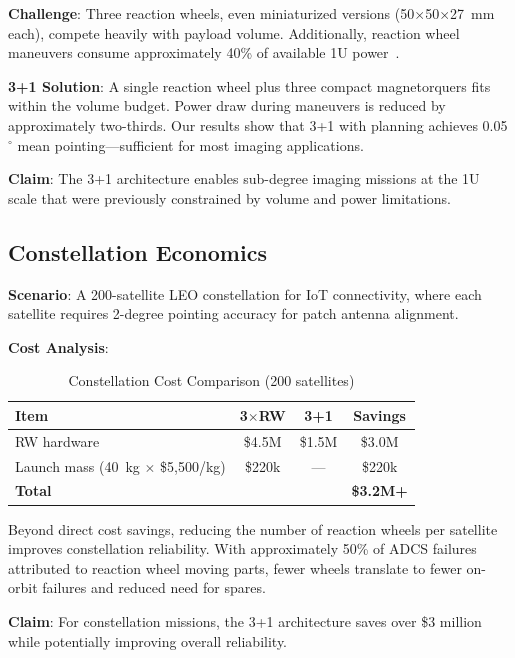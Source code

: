 \documentclass[9pt]{extarticle}
\begin{document}
\textbf{Challenge}: Three reaction wheels, even miniaturized versions (50$\times$50$\times$27~mm each), compete heavily with payload volume. Additionally, reaction wheel maneuvers consume approximately 40\% of available 1U power~\cite{calpoly2019cubesat}.

\textbf{3+1 Solution}: A single reaction wheel plus three compact magnetorquers fits within the volume budget. Power draw during maneuvers is reduced by approximately two-thirds. Our results show that 3+1 with planning achieves 0.05$^\circ$ mean pointing---sufficient for most imaging applications.

\textbf{Claim}: The 3+1 architecture enables sub-degree imaging missions at the 1U scale that were previously constrained by volume and power limitations.

\subsection{Constellation Economics}

\textbf{Scenario}: A 200-satellite LEO constellation for IoT connectivity, where each satellite requires 2-degree pointing accuracy for patch antenna alignment.

\textbf{Cost Analysis}:

\begin{table}[h]
    \centering
    \caption{Constellation Cost Comparison (200 satellites)}
    \label{tab:constellation_cost}
    \begin{tabular}{lccc}
        \toprule
        Item & 3$\times$RW & 3+1 & Savings \\
        \midrule
        RW hardware & \$4.5M & \$1.5M & \$3.0M \\
        Launch mass (40~kg $\times$ \$5,500/kg) & \$220k & --- & \$220k \\
        \midrule
        \textbf{Total} & & & \textbf{\$3.2M+} \\
        \bottomrule
    \end{tabular}
\end{table}

Beyond direct cost savings, reducing the number of reaction wheels per satellite improves constellation reliability. With approximately 50\% of ADCS failures attributed to reaction wheel moving parts, fewer wheels translate to fewer on-orbit failures and reduced need for spares.

\textbf{Claim}: For constellation missions, the 3+1 architecture saves over \$3 million while potentially improving overall reliability.
\end{document}
